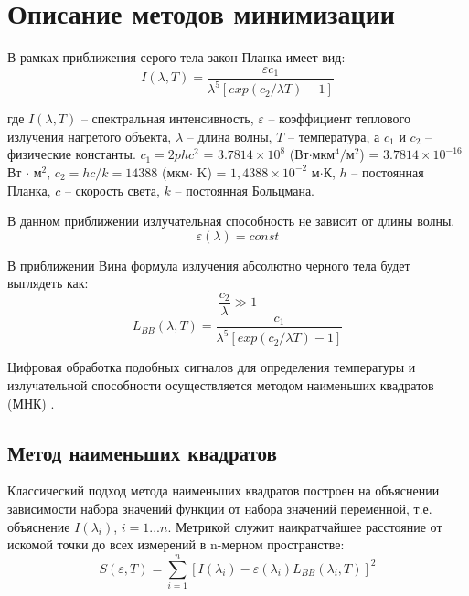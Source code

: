 \section{Описание методов минимизации}

В рамках приближения серого тела закон Планка имеет вид:
\begin{equation}
	I(\lambda,T) = \dfrac{\varepsilon c_{1}}{\lambda^5 [exp(c_2/\lambda T)-1]}
\end{equation}

где $I(\lambda,T)$ – спектральная интенсивность, $\varepsilon$ – коэффициент теплового излучения нагретого объекта, $\lambda$ – длина волны, $T$ – температура, а $c_{1}$ и $c_{2}$ – физические константы. $c_{1} = 2p h c^2$ = $3.7814 \times 10^8$ (Вт$\cdot$мкм$^4/$м$^2$) = $3.7814 \times 10^{-16}$ Вт $\cdot$ м$^2$, $c_{2}  = hc/k = 14388$ (мкм$\cdot$ K) = $1,4388 \times 10^{-2}$  м$\cdot$К, $h$ – постоянная Планка, $c$ – скорость света, $k$ – постоянная Больцмана.

В данном приближении излучательная способность не зависит от длины волны.
\begin{equation}
\label{eq::vin}
	\varepsilon(\lambda) = const
\end{equation}

В приближении Вина формула излучения абсолютно черного тела будет выглядеть как:
$$
	\dfrac{c_{2}}{\lambda} \gg 1
$$
\begin{equation}
	L_{BB}(\lambda,T) = \dfrac{c_{1}}{\lambda^5 [exp(c_2/\lambda T)-1]}
\end{equation}

Цифровая обработка подобных сигналов для определения температуры и излучательной способности осуществляется методом наименьших квадратов (МНК) \cite{7}.

\subsection{Метод наименьших квадратов}

Классический подход метода наименьших квадратов построен на объяснении зависимости набора значений функции от набора значений переменной, т.е. объяснение $I(\lambda_i)$, $i = 1...n$. Метрикой служит наикратчайшее расстояние от искомой точки до всех измерений в n-мерном пространстве:
\begin{equation}
\label{eq::sum_quad_div}
	S(\varepsilon,T) = \sum\limits_{i=1}^n [I(\lambda_i )-\varepsilon(\lambda_i)L_{BB} (\lambda_i,T)]^2  
\end{equation}

